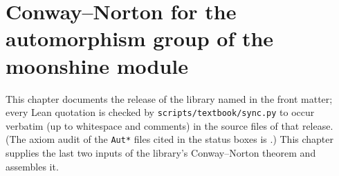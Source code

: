 \chapter{Conway--Norton for the automorphism group of the moonshine module}\label{ch:20}

\providecommand{\chtwentylean}[1]{\texttt{\directlua{ local s = "\luaescapestring{\detokenize{#1}}" local first = true for c in s:gmatch(utf8.charpattern) do if (not first) and c:match("^[A-Z]$") then tex.sprint("\string\\allowbreak{}") end tex.sprint(-2, c) if c == "_" or c == "." then tex.sprint("\string\\allowbreak{}") end first = false end}}}
\providecommand{\chtwentyfile}[1]{\texttt{\directlua{ local s = "\luaescapestring{\detokenize{#1}}" local first = true for c in s:gmatch(utf8.charpattern) do if (not first) and c:match("^[A-Z]$") then tex.sprint("\string\\allowbreak{}") end tex.sprint(-2, c) first = false end}}}
\providecommand{\chtwentyVL}{V_\Leech^{+}}
\providecommand{\chtwentyTp}{T^{+}}
\providecommand{\chtwentyvac}{\mathbf 1}
\providecommand{\chtwentym}{\mathfrak m}
\providecommand{\chtwentyg}{\mathfrak g}
\providecommand{\chtwentyLf}{\Leech_4}
\begingroup\setlength{\emergencystretch}{3em}\sloppy

This chapter documents the release of the library named in the front matter; every Lean quotation is checked by
\texttt{scripts/textbook/sync.py} to occur verbatim (up to whitespace and comments) in the source files of that
release.  (The axiom audit of the \texttt{Aut*} files cited in the status boxes is
.)  This chapter supplies the last two inputs of the library's
Conway--Norton theorem and assembles it.

